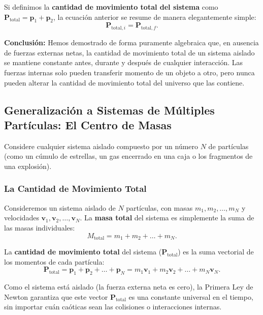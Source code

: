 \documentclass[11pt,a4paper]{book}
\begin{document}
Si definimos la \textbf{cantidad de movimiento total del sistema} como $\boldsymbol{P}_{\text{total}} = \boldsymbol{p}_1 + \boldsymbol{p}_2$, la ecuación anterior se resume de manera elegantemente simple:
\begin{equation}
    \boldsymbol{P}_{\text{total}, i} = \boldsymbol{P}_{\text{total}, f}.
\end{equation}

\textbf{Conclusión:}
Hemos demostrado de forma puramente algebraica que, en ausencia de fuerzas externas netas, la cantidad de movimiento total de un sistema aislado se mantiene constante antes, durante y después de cualquier interacción. Las fuerzas internas solo pueden transferir momento de un objeto a otro, pero nunca pueden alterar la cantidad de movimiento total del universo que las contiene.

\subsection{Generalización a Sistemas de Múltiples Partículas: El Centro de Masas}

Considere cualquier sistema aislado compuesto por un número $N$ de partículas (como un cúmulo de estrellas, un gas encerrado en una caja o los fragmentos de una explosión).

\subsubsection{La Cantidad de Movimiento Total}

Consideremos un sistema aislado de $N$ partículas, con masas $m_1, m_2, \dots, m_N$ y velocidades $\boldsymbol{v}_1, \boldsymbol{v}_2, \dots, \boldsymbol{v}_N$. La \textbf{masa total} del sistema es simplemente la suma de las masas individuales:
\begin{equation}
    M_{\text{total}} = m_1 + m_2 + \dots + m_N.
\end{equation}

La \textbf{cantidad de movimiento total} del sistema ($\boldsymbol{P}_{\text{total}}$) es la suma vectorial de los momentos de cada partícula:
\begin{equation}
    \boldsymbol{P}_{\text{total}} = \boldsymbol{p}_1 + \boldsymbol{p}_2 + \dots + \boldsymbol{p}_N = m_1\boldsymbol{v}_1 + m_2\boldsymbol{v}_2 + \dots + m_N\boldsymbol{v}_N.
    \label{eq:momento_n_particulas}
\end{equation}

Como el sistema está aislado (la fuerza externa neta es cero), la Primera Ley de Newton garantiza que este vector $\boldsymbol{P}_{\text{total}}$ es una constante universal en el tiempo, sin importar cuán caóticas sean las colisiones o interacciones internas.
\end{document}
